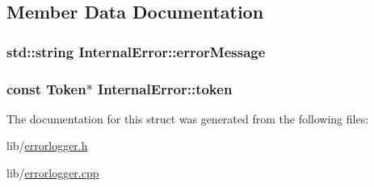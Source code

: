 \subsection{Member Data Documentation}
\hypertarget{struct_internal_error_a82a57b5fd52598ee993b9b23c7515627}{
\subsubsection[{error\-Message}]{\setlength{\rightskip}{0pt plus 5cm}std\-::string Internal\-Error\-::error\-Message}}\label{struct_internal_error_a82a57b5fd52598ee993b9b23c7515627}
\hypertarget{struct_internal_error_afb0e74253352a92fe5fcfe2b644cde3d}{
\subsubsection[{token}]{\setlength{\rightskip}{0pt plus 5cm}const {\bf Token}$\ast$ Internal\-Error\-::token}}\label{struct_internal_error_afb0e74253352a92fe5fcfe2b644cde3d}


The documentation for this struct was generated from the following files\-:\begin{DoxyCompactItemize}
\item 
lib/\hyperlink{errorlogger_8h}{errorlogger.\-h}\item 
lib/\hyperlink{errorlogger_8cpp}{errorlogger.\-cpp}\end{DoxyCompactItemize}
